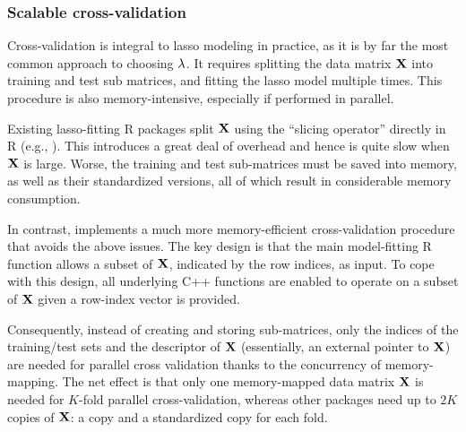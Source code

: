 %


\subsubsection{Scalable cross-validation}


Cross-validation is integral to lasso modeling in practice, as it is by far the most common approach to choosing $\lambda$. It requires splitting the data matrix $\mathbf{X}$ into training and test sub matrices, and fitting the lasso model multiple times. This procedure is also memory-intensive, especially if performed in parallel.

Existing lasso-fitting R packages split $\mathbf{X}$ using the ``slicing operator'' directly in R (e.g., ). This introduces a great deal of overhead and hence is quite slow when $\mathbf{X}$ is large. Worse, the training and test sub-matrices must be saved into memory, as well as their standardized versions, all of which result in considerable memory consumption. 

In contrast,  implements a much more memory-efficient cross-validation procedure that avoids the above issues. The key design is that the main model-fitting R function allows a subset of $\mathbf{X}$, indicated by the row indices, as input. To cope with this design, all underlying C++ functions are enabled to operate on a subset of $\mathbf{X}$ given a row-index vector is provided.

Consequently, instead of creating and storing sub-matrices, only the indices of the training/test sets and the descriptor of $\mathbf{X}$ (essentially, an external pointer to $\mathbf{X}$) are needed for parallel cross validation thanks to the concurrency of memory-mapping. The net effect is that only one memory-mapped data matrix $\mathbf{X}$ is needed for $K$-fold parallel cross-validation, whereas other packages need up to $2K$ copies of $\mathbf{X}$: a copy and a standardized copy for each fold.

